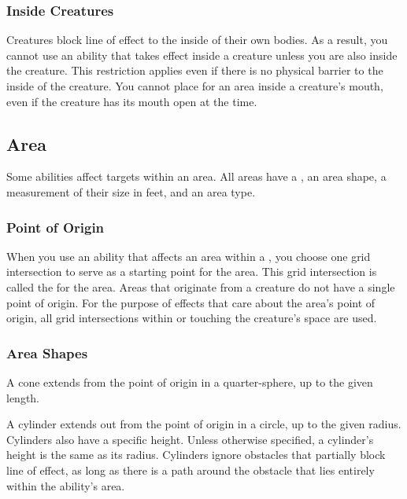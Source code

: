         \subsubsection{Inside Creatures}
            Creatures block line of effect to the inside of their own bodies.
            As a result, you cannot use an ability that takes effect inside a creature unless you are also inside the creature.
            This restriction applies even if there is no physical barrier to the inside of the creature.
            You cannot place  for an area inside a creature's mouth, even if the creature has its mouth open at the time.

    \subsection{Area}\label{Area}

        Some abilities affect targets within an area.
        All areas have a , an area shape, a measurement of their size in feet, and an area type.

        \subsubsection{Point of Origin}\label{Point of Origin}
            When you use an ability that affects an area within a , you choose one grid intersection to serve as a starting point for the area.
            This grid intersection is called the  for the area.
            Areas that originate from a creature do not have a single point of origin.
            For the purpose of effects that care about the area's point of origin, all grid intersections within or touching the creature's space are used.

        \subsubsection{Area Shapes}\label{Area Shapes}

             A cone extends from the point of origin in a quarter-sphere, up to the given length.

             A cylinder extends out from the point of origin in a circle, up to the given radius.
            Cylinders also have a specific height.
            Unless otherwise specified, a cylinder's height is the same as its radius.
            Cylinders ignore obstacles that partially block line of effect, as long as there is a path around the obstacle that lies entirely within the ability's area.

